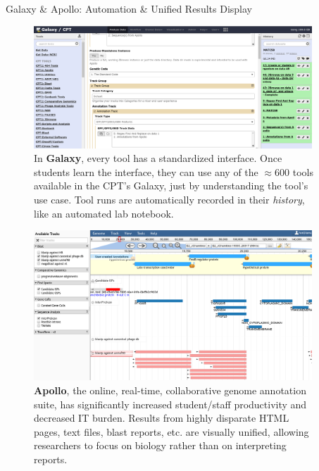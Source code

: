 \documentclass[final,t]{beamer}
\begin{document}
\begin{frame}[fragile]
\begin{columns}[t]
\begin{column}{.36\linewidth}
        \end{column}
        \begin{column}{.60\linewidth}
            \begin{block}{Galaxy \& Apollo: Automation \& Unified Results Display }
                \begin{figure}
                    \includegraphics[width=0.98\textwidth]{./media/galaxy.png}
                    \caption{In \textbf{Galaxy}, every tool has a standardized
                        interface. Once students learn the interface, they can
                        use any of the $\approx$600 tools available in the
                        CPT's Galaxy, just by understanding the tool's use
                        case. Tool runs are automatically recorded in their
                        \emph{history}, like an automated lab notebook.}
                \end{figure}
                \begin{figure}
                    \includegraphics[width=0.98\textwidth]{./media/apollo.png}
                    \caption{\textbf{Apollo}, the online, real-time,
                    collaborative genome annotation suite, has significantly
                    increased student/staff productivity and
                    decreased IT burden. Results from highly disparate HTML
                    pages, text files, blast reports, etc. are visually
                    unified, allowing researchers to focus on biology rather
                    than on interpreting reports.}
                \end{figure}


\end{block}
\end{column}
\end{columns}
\end{frame}
\end{document}
